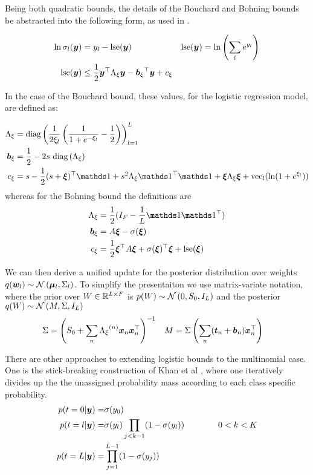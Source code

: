 Being both quadratic bounds, the details of the Bouchard and Bohning bounds be abstracted into the following form, as used in \cite{Khan2010}.

\begin{align}
\ln \sigma_l(\bm y) & = y_l - \text{lse} (\bm y) & \text{lse} (\bm y) & = \ln \left(\sum_l e^{y_l} \right)\\
\text{lse}(\bm y) & \leq \frac{1}{2} \bm y^\top { \Lambda_{\xi} } \bm y - { \bm b_{\xi} }^\top\bm y + { c_{\xi} }
\end{align}

In the case of the Bouchard bound, these values, for the logistic regression model, are defined as:

\begin{align}
\Axi & = \diag{\frac{1}{2\xi_l} \left( \frac{1}{1 + e^{-\xi_l}} - \half\right) }_{l=1}^L  \\
\bxi & = \half - 2 s \text{ }\diag{\Axi} \\
\cxi & = s - \half (s + \vv{\xi})\T\one + s^2\Axi \one\T\one + \vv{\xi}\Axi\vv{\xi} + \text{vec}_l(\ln (1 + e^{\xi_l}))
\end{align}
whereas for the Bohning bound the definitions are
\begin{align}
\Axi & = \half (I_F - \frac{1}{L} \one \one \T) \\
\bxi & = A \vv{\xi} - \sigma(\vv{\xi})\\
\cxi & = \half \vv{\xi}\T A \vv{\xi} + \sigma(\vv{\xi})\T\vv{\xi} + \lse(\vv{\xi})
\end{align}

We can then derive a unified update for the posterior distribution over weights $q(\bm w_l) \sim \mathcal{N} \left( {\bm \mu_l}, {\Sigma_l} \right)$. To simplify the presentaiton we use matrix-variate notation, where the prior over $W \in { \mathbb{R}^{L \times F} }$ is $p(W) \sim \mathcal{N} \left(0, S_0, I_L\right)$ and the posterior $q(W) \sim \mathcal{N} \left(M, \Sigma, I_L\right)$
\begin{align}
\Sigma &= {\left( S_0 + \sum_n { \Lambda_{\xi} }^{(n)}\bm x_n\bm x_n^\top \right)}^{-1} & M &= \Sigma \left(\sum_n (\bm t_n + \bm b_n)\bm x_n^\top\right)
\end{align}


\newcommand \C { \mathcal{C} }

There are other approaches to extending logistic bounds to the multinomial case. One is the stick-breaking construction of Khan et al \cite{Khan2012stick}, where one iteratively divides up the the unassigned probability mass according to each class specific probability.
\begin{align}
\begin{split}
p(t = 0 | \bm y) = & \sigma(y_0) \\
p(t = l | \bm y) = & \sigma(y_l) \prod_{j < k - 1} (1 - \sigma(y_l)) \qquad\qquad 0 < k < K \\
p (t = L | \bm y) = & \prod_{j = 1}^{L - 1} (1 - \sigma(y_j))
\end{split}
\end{align}

